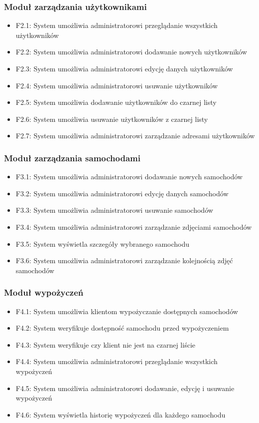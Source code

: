 \documentclass[12pt,a4paper]{article}
\begin{document}
\subsubsection{Moduł zarządzania użytkownikami}
\begin{itemize}
    \item F2.1: System umożliwia administratorowi przeglądanie wszystkich użytkowników
    \item F2.2: System umożliwia administratorowi dodawanie nowych użytkowników
    \item F2.3: System umożliwia administratorowi edycję danych użytkowników
    \item F2.4: System umożliwia administratorowi usuwanie użytkowników
    \item F2.5: System umożliwia dodawanie użytkowników do czarnej listy
    \item F2.6: System umożliwia usuwanie użytkowników z czarnej listy
    \item F2.7: System umożliwia administratorowi zarządzanie adresami użytkowników
\end{itemize}

\subsubsection{Moduł zarządzania samochodami}
\begin{itemize}
    \item F3.1: System umożliwia administratorowi dodawanie nowych samochodów
    \item F3.2: System umożliwia administratorowi edycję danych samochodów
    \item F3.3: System umożliwia administratorowi usuwanie samochodów
    \item F3.4: System umożliwia administratorowi zarządzanie zdjęciami samochodów
    \item F3.5: System wyświetla szczegóły wybranego samochodu
    \item F3.6: System umożliwia administratorowi zarządzanie kolejnością zdjęć samochodów
\end{itemize}

\subsubsection{Moduł wypożyczeń}
\begin{itemize}
    \item F4.1: System umożliwia klientom wypożyczanie dostępnych samochodów
    \item F4.2: System weryfikuje dostępność samochodu przed wypożyczeniem
    \item F4.3: System weryfikuje czy klient nie jest na czarnej liście
    \item F4.4: System umożliwia administratorowi przeglądanie wszystkich wypożyczeń
    \item F4.5: System umożliwia administratorowi dodawanie, edycję i usuwanie wypożyczeń
    \item F4.6: System wyświetla historię wypożyczeń dla każdego samochodu
\end{itemize}
\end{document}
